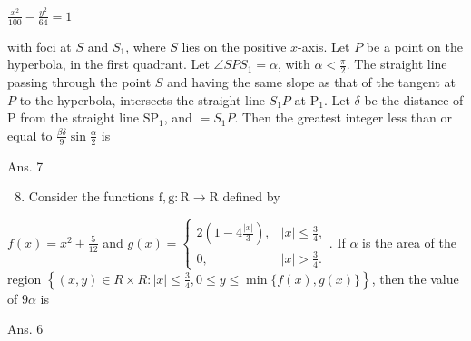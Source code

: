 \documentclass[10pt]{article}
\begin{document}
$\frac{x^{2}}{100}-\frac{y^{2}}{64}=1$

with foci at $S$ and $S_{1}$, where $S$ lies on the positive $x$-axis. Let $P$ be a point on the hyperbola, in the first quadrant. Let $\angle S P S_{1}=\alpha$, with $\alpha<\frac{\pi}{2}$. The straight line passing through the point $S$ and having the same slope as that of the tangent at $P$ to the hyperbola, intersects the straight line $S_{1} P$ at $\mathrm{P}_{1}$. Let $\delta$ be the distance of $\mathrm{P}$ from the straight line $\mathrm{SP}_{1}$, and $=S_{1} P$. Then the greatest integer less than or equal to $\frac{\beta \delta}{9} \sin \frac{\alpha}{2}$ is

Ans. 7

\begin{enumerate}
  \setcounter{enumi}{7}
  \item Consider the functions $\mathrm{f}, \mathrm{g}: \mathrm{R} \rightarrow \mathrm{R}$ defined by
\end{enumerate}

$f(x)=x^{2}+\frac{5}{12}$ and $g(x)=\left\{\begin{array}{cl}2\left(1-4 \frac{|x|}{3}\right), & |x| \leq \frac{3}{4}, \\ 0, & |x|>\frac{3}{4} .\end{array}\right.$. If $\alpha$ is the area of the region $\left\{(x, y) \in R \times R:|x| \leq \frac{3}{4}, 0 \leq y \leq \min \{f(x), g(x)\}\right\}$, then the value of $9 \alpha$ is

Ans. 6
\end{document}
